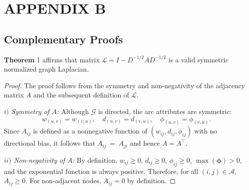 \documentclass[lettersize,journal]{IEEEtran}
\begin{document}
\section*{APPENDIX B}
\subsection*{Complementary Proofs}
\textbf{Theorem} 1 affirms that matrix $\mathcal{L} = I - D^{-1/2}AD^{-1/2}$ is a valid symmetric normalized graph Laplacian.

\begin{proof}
The proof follows from the symmetry and non-negativity of the adjacency matrix $A$ and the subsequent definition of $\mathcal{L}$.


    \textit{$i)$ Symmetry of $A$:} Although $\mathcal{G}$ is directed, the arc attributes are symmetric:
\[
w_{(u,v)} = w_{(v,u)},\quad
d_{(u,v)} = d_{(v,u)},\quad
\phi_{(u,v)} = \phi_{(v,u)}.
\]
Since $A_{ij}$ is defined as a nonnegative function of $(w_{ij}, d_{ij}, \phi_{ij})$
with no directional bias, it follows that $A_{ij}~=~A_{ji}$ and hence $A = A^\top$.

    \textit{$ii)$ Non-negativity of $A$:} By definition, $w_{ij} \geq 0$, $d_{ij} \geq 0$, $\phi_{ij} \geq 0$, $\max(\boldsymbol{\phi}) > 0$, and the exponential function is always positive. Therefore, for all $(i,j) \in \mathcal{A}$, $A_{ij} \geq 0$. For non-adjacent nodes, $A_{ij} = 0$ by definition.



\end{proof}
\end{document}
